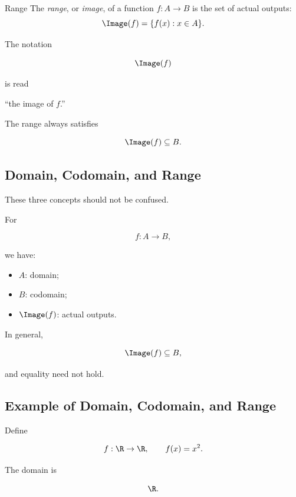 \begin{definitionbox}{Range}
The \emph{range}, or \emph{image}, of a function \(f:A\to B\) is the set of
actual outputs:
\[ \Image(f)=\{f(x):x\in A\}. \]
\end{definitionbox}

The notation

\[ \Image(f) \]

is read

\begin{center}
``the image of \(f\).''
\end{center}

The range always satisfies

\[ \Image(f)\subseteq B. \]

\subsection{Domain, Codomain, and Range}
\label{subsec:domain-codomain-range}

These three concepts should not be confused.

For

\[ f:A\to B, \]

we have:

\begin{itemize}
    \item \(A\): domain;
    \item \(B\): codomain;
    \item \(\Image(f)\): actual outputs.
\end{itemize}

In general,

\[ \Image(f)\subseteq B, \]

and equality need not hold.

\subsection{Example of Domain, Codomain, and Range}
\label{subsec:domain-codomain-range-example}

Define

\[ f:\R\to\R,\qquad f(x)=x^2. \]

The domain is

\[ \R. \]

